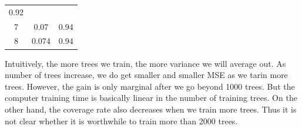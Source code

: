 \documentclass[]{article}
\begin{document}
\begin{longtable}[]{@{}ccc@{}}
\begin{minipage}[t]{0.13\columnwidth}
0.92\strut
\end{minipage}\tabularnewline
\begin{minipage}[t]{0.05\columnwidth}\centering\strut
7\strut
\end{minipage} & \begin{minipage}[t]{0.10\columnwidth}\centering\strut
0.07\strut
\end{minipage} & \begin{minipage}[t]{0.13\columnwidth}\centering\strut
0.94\strut
\end{minipage}\tabularnewline
\begin{minipage}[t]{0.05\columnwidth}\centering\strut
8\strut
\end{minipage} & \begin{minipage}[t]{0.10\columnwidth}\centering\strut
0.074\strut
\end{minipage} & \begin{minipage}[t]{0.13\columnwidth}\centering\strut
0.94\strut
\end{minipage}\tabularnewline
\bottomrule
\end{longtable}

Intuitively, the more trees we train, the more variance we will average
out. As number of trees increase, we do get smaller and smaller MSE as
we tarin more trees. However, the gain is only marginal after we go
beyond 1000 trees. But the computer training time is basically linear in
the number of training trees. On the other hand, the coverage rate also
decreases when we train more trees. Thus it is not clear whether it is
worthwhile to train more than 2000 trees.
\end{document}

